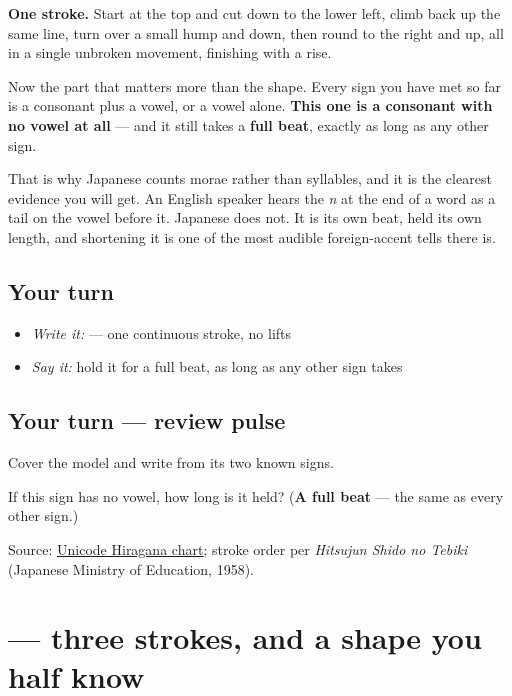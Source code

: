 \textbf{One stroke.} Start at the top and cut down to the lower left, climb back up the same line, turn over a small hump and down, then round to the right and up, all in a single unbroken movement, finishing with a rise.

Now the part that matters more than the shape. Every sign you have met so far is a consonant plus a vowel, or a vowel alone. \textbf{This one is a consonant with no vowel at all} — and it still takes a \textbf{full beat}, exactly as long as any other sign.

That is why Japanese counts morae rather than syllables, and it is the clearest evidence you will get. An English speaker hears the \emph{n} at the end of a word as a tail on the vowel before it. Japanese does not. It is its own beat, held its own length, and shortening it is one of the most audible foreign-accent tells there is.

\subsection*{Your turn}
\begin{itemize}
\raggedright
  \item \emph{Write it:}  — one continuous stroke, no lifts
  \item \emph{Say it:} hold it for a full beat, as long as any other sign takes
\end{itemize}

\subsection*{Your turn — review pulse}
Cover the model and write \textbf{} from its two known signs.

\begin{tcolorbox}[breakable,colback=teal!4,colframe=teal!35!black,title={Before you move on}]
If this sign has no vowel, how long is it held? (\textbf{A full beat} — the same as every other sign.)

Source: \href{https://www.unicode.org/charts/PDF/U3040.pdf}{Unicode Hiragana chart}; stroke order per \emph{Hitsujun Shido no Tebiki} (Japanese Ministry of Education, 1958).
\end{tcolorbox}
\section[\texorpdfstring{\ja{に} (ni)}{に (ni)}]{ — three strokes, and a shape you half know}

